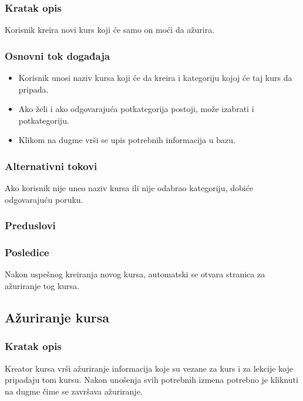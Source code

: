 \subsubsection{Kratak opis}
Korisnik kreira novi kurs koji će samo on moći da ažurira.

\subsubsection{Osnovni tok događaja}
\begin{itemize}
  \item Korisnik unosi naziv kursa koji će da kreira i kategoriju kojoj će taj kurs da pripada.
  \item Ako želi i ako odgovarajuća potkategorija postoji, može izabrati i potkategoriju.
  \item Klikom na dugme  vrši se upis potrebnih informacija u bazu.
\end{itemize}

\subsubsection{Alternativni tokovi}
Ako korisnik nije uneo naziv kursa ili nije odabrao kategoriju, dobiće odgovarajuću poruku.

\subsubsection{Preduslovi}

\subsubsection{Posledice}
Nakon uspešnog kreiranja novog kursa, automatski se otvara stranica za ažuriranje tog kursa.


\subsection{Ažuriranje kursa}
\label{subsec:azuriranje-kursa}

\subsubsection{Kratak opis}
Kreator kursa vrši ažuriranje informacija koje su vezane za kurs i za lekcije koje pripadaju tom kursu.
Nakon unošenja svih potrebnih izmena potrebno je kliknuti na dugme \SaveButton{} čime se završava ažuriranje.

